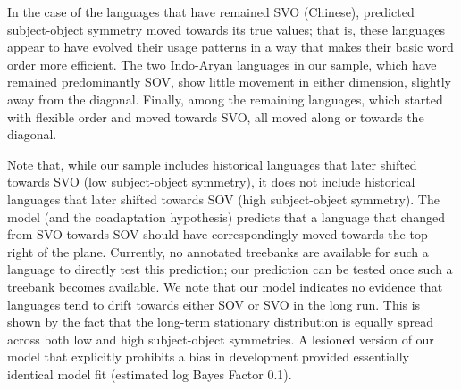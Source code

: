 \documentclass[11pt,a4paper]{article}
\newcommand\comment[1]{{\color{red}#1}}
\newcommand\mhahn[1]{{\color{red}(#1)}}
\begin{document}
In the case of the languages that have remained SVO (Chinese), predicted subject-object symmetry moved towards its true values; that is, these languages appear to have evolved their usage patterns in a way that makes their basic word order more efficient.
The two Indo-Aryan languages in our sample, which have remained predominantly SOV, show little movement in either dimension, slightly away from the diagonal.
Finally, among the remaining languages, which started with flexible order and moved towards SVO, all moved along or towards the diagonal.



Note that, while our sample includes historical languages that later shifted towards SVO (low subject-object symmetry), it does not include historical languages that later shifted towards SOV (high subject-object symmetry).
The model (and the coadaptation hypothesis) predicts that a language that changed from SVO towards SOV should have correspondingly moved towards the top-right of the plane. 
Currently, no annotated treebanks are available for such a language to directly test this prediction; our prediction can be tested once such a treebank becomes available.
We note that our model indicates no evidence that languages tend to drift towards either SOV or SVO in the long run.
This is shown by the fact that the long-term stationary distribution is equally spread across both low and high subject-object symmetries.
A lesioned version of our model that explicitly prohibits a bias in development provided essentially identical model fit (estimated log Bayes Factor 0.1).
\end{document}

